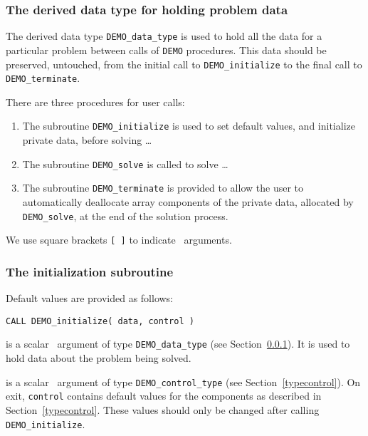 \documentclass{galahad}
\newcommand{\packagename}{DEMO}
\begin{document}

\subsubsection{The derived data type for holding problem data}\label{typedata}
The derived data type 
{\tt \packagename\_data\_type} 
is used to hold all the data for a particular problem between calls of 
{\tt \packagename} procedures. 
This data should be preserved, untouched, from the initial call to 
{\tt \packagename\_initialize}
to the final call to
{\tt \packagename\_terminate}.


\galarguments
There are three procedures for user calls:

\begin{enumerate}
\item The subroutine 
      {\tt \packagename\_initialize} 
      is used to set default values, and initialize private data, 
      before solving \ldots
\item The subroutine 
      {\tt \packagename\_solve} 
      is called to solve \ldots
\item The subroutine 
      {\tt \packagename\_terminate} 
      is provided to allow the user to automatically deallocate array 
       components of the private data, allocated by 
       {\tt \packagename\_solve}, 
       at the end of the solution process. 
\end{enumerate}
We use square brackets {\tt [ ]} to indicate \optional\ arguments.


\subsubsection{The initialization subroutine}\label{subinit}
 Default values are provided as follows:
\vspace*{1mm}

\hspace{8mm}
{\tt CALL \packagename\_initialize( data, control )}

\vspace*{-3mm}
\begin{description}

 is a scalar \intentinout\ argument of type 
{\tt \packagename\_data\_type}
(see Section~\ref{typedata}). It is used to hold data about the problem being 
solved.

 is a scalar \intentout\ argument of type 
{\tt \packagename\_control\_type}
(see Section~\ref{typecontrol}). 
On exit, {\tt control} contains default values for the components as
described in Section~\ref{typecontrol}.
These values should only be changed after calling 
{\tt \packagename\_initialize}.

\end{description}
\end{document}
